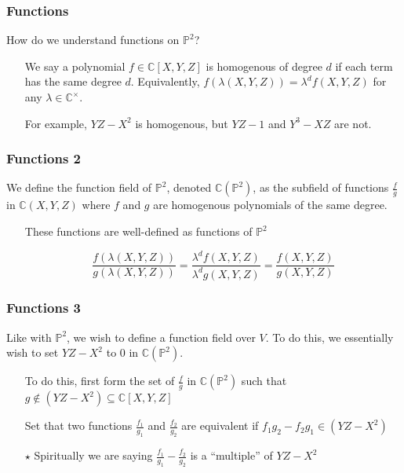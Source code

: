 \documentclass{beamer}
\theoremstyle{definition}
\begin{document}
\begin{frame}
    \frametitle{Functions}

    How do we understand functions on \(\mathbb{P}^2\)?
    \begin{itemize}
\item[\textrightarrow]
    We say a polynomial \(f\in \mathbb{C}[X, Y, Z]\) is homogenous of degree \(d\) if each term has the same degree \(d\). Equivalently, \(f(\lambda(X, Y, Z)) = \lambda^d f(X, Y, Z)\) for any \(\lambda\in\mathbb{C}^\times\).

\item[\textrightarrow] For example, \(YZ - X^2\) is homogenous, but \(YZ - 1\) and \(Y^3 - XZ\) are not.

\end{itemize}
\end{frame}
\begin{frame}
    \frametitle{Functions 2}
    We define the function field of \(\mathbb{P}^2\), denoted \(\mathbb{C}(\mathbb{P}^2)\), as the subfield of functions \( \frac{f}{g}\) in \(\mathbb{C}(X, Y, Z)\) where \(f\) and \(g\) are homogenous polynomials of the same degree.
    \begin{itemize}
        \item[\textrightarrow] These functions are well-defined as functions of \(\mathbb{P}^2\)
       
            \[\frac{f(\lambda(X, Y, Z))}{g(\lambda(X, Y, Z))} = \frac{\lambda^d f(X, Y, Z)}{\lambda^d g(X, Y, Z)} = \frac{f(X, Y, Z)}{g(X, Y, Z)}\]
    \end{itemize}



\end{frame}

\begin{frame}
    \frametitle{Functions 3}
    Like with \(\mathbb{P}^2\), we wish to define a function field over \(V\). To do this, we essentially wish to set \(YZ - X^2\) to \(0\) in \(\mathbb{C}(\mathbb{P}^2)\).
    \begin{itemize}
        \item[\textrightarrow] To do this, first form the set of \(\frac{f}{g}\) in \(\mathbb{C}(\mathbb{P}^2)\) such that \(g\notin (YZ-X^2)\subseteq \mathbb{C}[X, Y, Z]\)         
        \item[\textrightarrow] Set that two functions \( \frac{f_1}{g_1}\) and \( \frac{f_2}{g_2}\) are equivalent if \(f_1g_2 - f_2g_1\in (YZ-X^2)\)

        \item[\(\star\)] Spiritually we are saying \( \frac{f_1}{g_1} - \frac{f_2}{g_2}\) is a ``multiple'' of \(YZ - X^2\) %
        
    \end{itemize}
       \end{frame}
\end{document}
